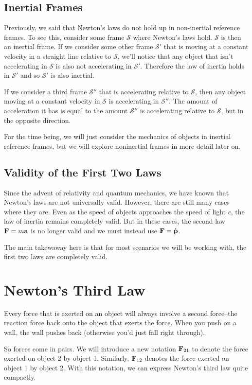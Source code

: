 \subsection*{Inertial Frames}
Previously, we said that Newton's laws do not hold up in non-inertial reference frames. To see this, consider some frame $\mathcal{S}$ where Newton's laws hold. $\mathcal{S}$ is then an inertial frame. If we consider some other frame $\mathcal{S}'$ that is moving at a constant velocity in a straight line relative to $\mathcal{S}$, we'll notice that any object that isn't accelerating in $\mathcal{S}$ is also not accelerating in $\mathcal{S}'$. Therefore the law of inertia holds in $\mathcal{S}'$ and so $\mathcal{S}'$ is also inertial. 

If we consider a third frame $\mathcal{S}''$ that is accelerating relative to $\mathcal{S}$, then any object moving at a constant velocity in $\mathcal{S}$ is accelerating in $\mathcal{S}''$. The amount of acceleration it has is equal to the amount $\mathcal{S}''$ is accelerating relative to $\mathcal{S}$, but in the opposite direction.

For the time being, we will just consider the mechanics of objects in inertial reference frames, but we will explore noninertial frames in more detail later on.

\subsection*{Validity of the First Two Laws}
Since the advent of relativity and quantum mechanics, we have known that Newton's laws are not universally valid. However, there are still many cases where they are. Even as the speed of objects approaches the speed of light $c$, the law of inertia remains completely valid. But in these cases, the second law $\mathbf{F} = m\mathbf{a}$ is no longer valid and we must instead use $\mathbf{F} = \mathbf{\dot p}$.

The main takewaway here is that for most scenarios we will be working with, the first two laws are completely valid.
\section{Newton's Third Law}
Every force that is exerted on an object will always involve a second force--the reaction force back onto the object that exerts the force. When you push on a wall, the wall pushes back (otherwise you'd just fall right through). 

So forces come in pairs. We will introduce a new notation $\mathbf{F}_{21}$ to denote the force exerted on object 2 by object 1. Similarly, $\mathbf{F}_{12}$ denotes the force exerted on object 1 by object 2. With this notation, we can express Newton's third law quite compactly. 

